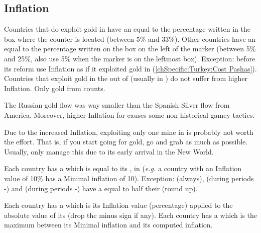 \subsection{Inflation}
\bparag Countries that do exploit gold in \continentAmerica
have an  equal to the percentage written in the box
where the counter is located (between 5\% and 33\%).
\bparag Other countries have an  equal to the
percentage written on the box on the left of the marker (between 5\% and 25\%,
also use 5\% when the marker is on the leftmost box).
\bparag Exception: \TUR before its reform use Inflation as if it exploited
gold in \continentAmerica (\ref{chSpecific:Turkey:Cost Pashas}).
\bparag Countries that exploit gold in the \ROTW out of \continentAmerica
(usually \RUS in \continentSiberia) do not suffer from higher Inflation. Only
gold from \continentAmerica counts.

\begin{designnote}
  The Russian gold flow was way smaller than the Spanish Silver flow from
  America. Moreover, higher Inflation for \RUS causes some non-historical
  gamey tactics.
\end{designnote}

\begin{playtip}
  Due to the increased Inflation, exploiting only one mine in
  \continentAmerica is probably not worth the effort. That is, if you start
  going for gold, go and grab as much as possible. Usually, only \HIS manage
  this due to its early arrival in the New World.
\end{playtip}

\bparag Each country has a  which is equal to its
, in \ducats (\emph{e.g.} a country with an Inflation
value of 10\% has a Minimal inflation of 10\ducats).
\bparag Exception: \POL (always), \RUS (during periods -)
and \SUE (during periods -) %
have a  equal to half their 
(round up).

\bparag Each country has a  which is its Inflation
value (percentage) applied to the absolute value of its \RT (drop the minus
sign if any).
\bparag Each country has a  which is the maximum
between its Minimal inflation and its computed inflation.

